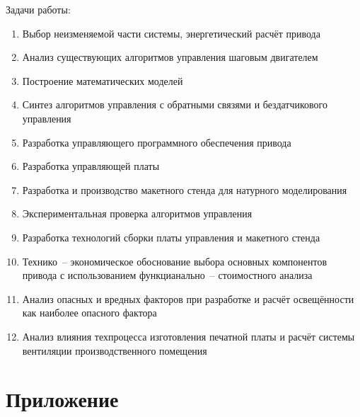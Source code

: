 \documentclass[a4paper, 14pt]{extarticle}
\begin{document}
\setcounter{page}{5}

\tableofcontents

\newpage


\newpage
Задачи работы:
\begin{enumerate}
    \item Выбор неизменяемой части системы, энергетический расчёт привода
    \item Анализ существующих алгоритмов управления шаговым двигателем
    \item Построение математических моделей
    \item Синтез алгоритмов управления с обратными связями и бездатчикового
        управления
    \item Разработка управляющего программного обеспечения привода
    \item Разработка управляющей платы
    \item Разработка и производство макетного стенда для натурного моделирования
    \item Экспериментальная проверка алгоритмов управления
    \item Разработка технологий сборки платы управления и макетного стенда
    \item Технико~-- экономическое обоснование выбора основных компонентов
        привода с использованием функцианально~-- стоимостного анализа
    \item Анализ опасных и вредных факторов при разработке и расчёт освещённости
        как наиболее опасного фактора
    \item Анализ влияния техпроцесса изготовления печатной платы и расчёт системы
        вентиляции производственного помещения
\end{enumerate}









\clearpage
\section{Приложение}
\subsection[Список иллюстраций]{}
\listoffigures
\clearpage
\subsection[Список таблиц]{}
\listoftables


\end{document}
